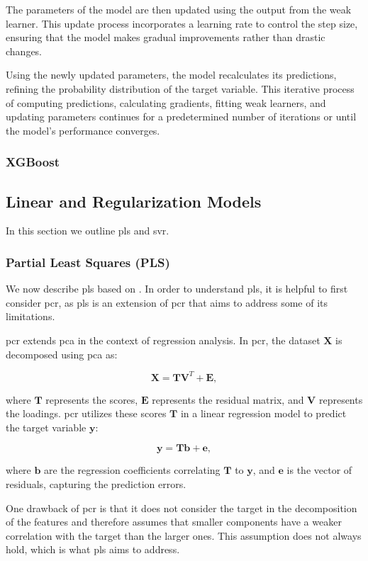 The parameters of the model are then updated using the output from the weak learner.
This update process incorporates a learning rate to control the step size, ensuring that the model makes gradual improvements rather than drastic changes.

Using the newly updated parameters, the model recalculates its predictions, refining the probability distribution of the target variable.
This iterative process of computing predictions, calculating gradients, fitting weak learners, and updating parameters continues for a predetermined number of iterations or until the model's performance converges.

\subsubsection{XGBoost}

\subsection{Linear and Regularization Models}
In this section we outline \gls{pls} and \gls{svr}.
\subsubsection{Partial Least Squares (PLS)}
We now describe \gls{pls} based on \citet{James2023AnIS}.
In order to understand \gls{pls}, it is helpful to first consider \gls{pcr}, as \gls{pls} is an extension of \gls{pcr} that aims to address some of its limitations.

\gls{pcr} extends \gls{pca} in the context of regression analysis.
In \gls{pcr}, the dataset $\mathbf{X}$ is decomposed using \gls{pca} as:

$$
\mathbf{X} = \mathbf{TV}^T + \mathbf{E},
$$

where $\mathbf{T}$ represents the scores, $\mathbf{E}$ represents the residual matrix, and $\mathbf{V}$ represents the loadings.
\gls{pcr} utilizes these scores $\mathbf{T}$ in a linear regression model to predict the target variable $\mathbf{y}$:

$$
\mathbf{y} = \mathbf{Tb} + \mathbf{e},
$$

where $\mathbf{b}$ are the regression coefficients correlating $\mathbf{T}$ to $\mathbf{y}$, and $\mathbf{e}$ is the vector of residuals, capturing the prediction errors.

One drawback of \gls{pcr} is that it does not consider the target in the decomposition of the features and therefore assumes that smaller components have a weaker correlation with the target than the larger ones.
This assumption does not always hold, which is what \gls{pls} aims to address.

